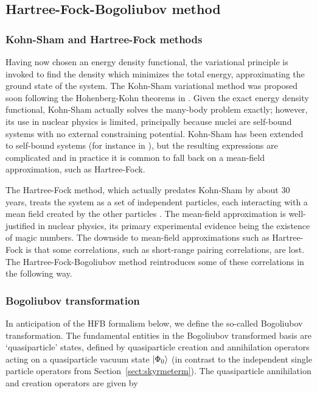 \subsection{Hartree-Fock-Bogoliubov method}\label{sect:HFB}
\subsubsection{Kohn-Sham and Hartree-Fock methods}

Having now chosen an energy density functional, the variational principle is invoked to find the density which minimizes the total energy, approximating the ground state of the system. The Kohn-Sham variational method was proposed soon following the Hohenberg-Kohn theorems in \cite{Kohn1965}. Given the exact energy density functional, Kohn-Sham actually solves the many-body problem exactly; however, its use in nuclear physics is limited, principally because nuclei are self-bound systems with no external constraining potential. Kohn-Sham has been extended to self-bound systems (for instance in \cite{engel2007}), but the resulting expressions are complicated and in practice it is common to fall back on a mean-field approximation, such as Hartree-Fock.

The Hartree-Fock method, which actually predates Kohn-Sham by about 30 years, treats the system as a set of independent particles, each interacting with a mean field created by the other particles \cite{Ring1980}. The mean-field approximation is well-justified in nuclear physics, its primary experimental evidence being the existence of magic numbers. The downside to mean-field approximations such as Hartree-Fock is that some correlations, such as short-range pairing correlations, are lost. The Hartree-Fock-Bogoliubov method reintroduces some of these correlations in the following way.

\subsubsection{Bogoliubov transformation}

In anticipation of the HFB formalism below, we define the so-called Bogoliubov transformation. The fundamental entities in the Bogoliubov transformed basis are `quasiparticle' states, defined by quasiparticle creation and annihilation operators acting on a quasiparticle vacuum state $\ket{\Phi_0}$ (in contrast to the independent single particle operators from Section~\ref{sect:skyrmeterm}). The quasiparticle annihilation and creation operators are given by

